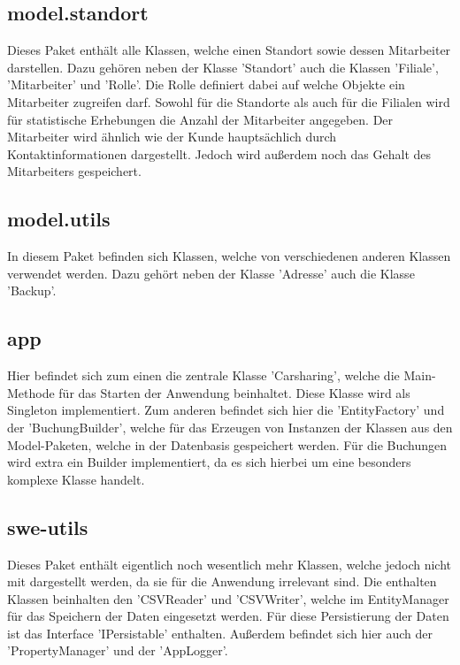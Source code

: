 \subsection{model.standort}

Dieses Paket enthält alle Klassen, welche einen Standort sowie dessen Mitarbeiter darstellen. Dazu gehören neben der Klasse 'Standort' auch die Klassen 'Filiale', 'Mitarbeiter' und 'Rolle'. Die Rolle definiert dabei auf welche Objekte ein Mitarbeiter zugreifen darf. Sowohl für die Standorte als auch für die Filialen wird für statistische Erhebungen die Anzahl der Mitarbeiter angegeben. Der Mitarbeiter wird ähnlich wie der Kunde hauptsächlich durch Kontaktinformationen dargestellt. Jedoch wird außerdem noch das Gehalt des Mitarbeiters gespeichert.

\subsection{model.utils}

In diesem Paket befinden sich Klassen, welche von verschiedenen anderen Klassen verwendet werden. Dazu gehört neben der Klasse 'Adresse' auch die Klasse 'Backup'.

\subsection{app}

Hier befindet sich zum einen die zentrale Klasse 'Carsharing', welche die Main-Methode für das Starten der Anwendung beinhaltet. Diese Klasse wird als Singleton implementiert. Zum anderen befindet sich hier die 'EntityFactory' und der 'BuchungBuilder', welche für das Erzeugen von Instanzen der Klassen aus den Model-Paketen, welche in der Datenbasis gespeichert werden. Für die Buchungen wird extra ein Builder implementiert, da es sich hierbei um eine besonders komplexe Klasse handelt. 

\subsection{swe-utils}

Dieses Paket enthält eigentlich noch wesentlich mehr Klassen, welche jedoch nicht mit dargestellt werden, da sie für die Anwendung irrelevant sind. Die enthalten Klassen beinhalten den 'CSVReader' und 'CSVWriter', welche im EntityManager für das Speichern der Daten eingesetzt werden. Für diese Persistierung der Daten ist das Interface 'IPersistable' enthalten. Außerdem befindet sich hier auch der 'PropertyManager' und der 'AppLogger'.

